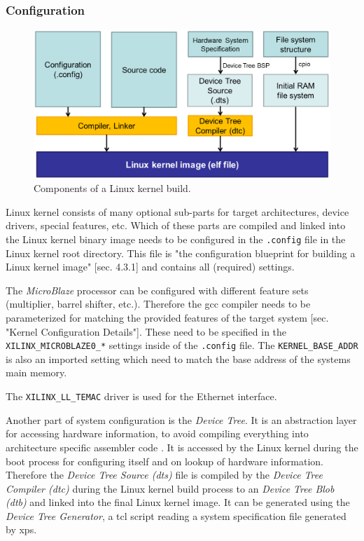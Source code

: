 \subsubsection{Configuration}

\begin{figure}
	\centering
	\includegraphics[width=.6\textwidth]{linux-config-build.png}
	\caption{Components of a Linux kernel build.}
\end{figure}

Linux kernel consists of many optional sub-parts for target architectures, device drivers, special features, etc. Which of these parts are compiled and linked into the Linux kernel binary image needs to be configured in the \texttt{.config} file in the Linux kernel root directory. This file is "the configuration blueprint for building a Linux kernel image" \cite{linuxPrimer}[sec. 4.3.1] and contains all (required) settings.

The \textit{MicroBlaze} processor can be configured with different feature sets (multiplier, barrel shifter, etc.). Therefore the \gls{gcc} compiler needs to be parameterized for matching the provided features of the target system \cite{mb_linux}[sec. "Kernel Configuration Details"]. These need to be specified in the \texttt{XILINX\_MICROBLAZE0\_*} settings inside of the \texttt{.config} file. The \texttt{KERNEL\_BASE\_ADDR} is also an imported setting which need to match the base address of the systems main memory.

The \texttt{XILINX\_LL\_TEMAC} driver is used for the Ethernet interface.

Another part of system configuration is the \textit{Device Tree}. It is an abstraction layer for accessing hardware information, to avoid compiling everything into architecture specific assembler code \cite{device_tree}. It is accessed by the Linux kernel during the boot process for configuring itself and on lookup of hardware information. Therefore the \textit{Device Tree Source (dts)} file is compiled by the \textit{Device Tree Compiler (dtc)} during the Linux kernel build process to an \textit{Device Tree Blob (dtb)} and linked into the final Linux kernel image. It can be generated using the \textit{Device Tree Generator}, a \gls{tcl} script reading a system specification file generated by \gls{xps}.
\\

